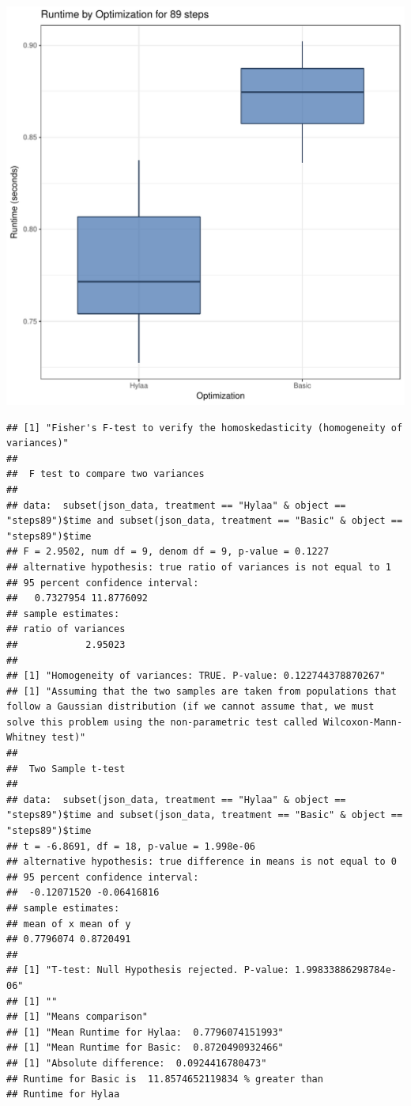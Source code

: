 \documentclass{article}\usepackage[]{graphicx}\usepackage[]{color}
\makeatletter
\def\maxwidth{ %
  \ifdim\Gin@nat@width>\linewidth
    \linewidth
  \else
    \Gin@nat@width
  \fi
}
\newenvironment{kframe}{%
 \def\at@end@of@kframe{}%
 \ifinner\ifhmode%
  \def\at@end@of@kframe{\end{minipage}}%
  \begin{minipage}{\columnwidth}%
 \fi\fi%
 \def\FrameCommand##1{\hskip\@totalleftmargin \hskip-\fboxsep
 \colorbox{shadecolor}{##1}\hskip-\fboxsep
     \hskip-\linewidth \hskip-\@totalleftmargin \hskip\columnwidth}%
 \MakeFramed {\advance\hsize-\width
   \@totalleftmargin\z@ \linewidth\hsize
   \@setminipage}}%
 {\par\unskip\endMakeFramed%
 \at@end@of@kframe}
\newenvironment{knitrout}{}{} %
\makeatother
\begin{document}
\begin{knitrout}
\color{fgcolor}
\includegraphics[width=\maxwidth]{figure/RH3_steps89-1} 
\begin{kframe}\begin{verbatim}
## [1] "Fisher's F-test to verify the homoskedasticity (homogeneity of variances)"
## 
## 	F test to compare two variances
## 
## data:  subset(json_data, treatment == "Hylaa" & object == "steps89")$time and subset(json_data, treatment == "Basic" & object == "steps89")$time
## F = 2.9502, num df = 9, denom df = 9, p-value = 0.1227
## alternative hypothesis: true ratio of variances is not equal to 1
## 95 percent confidence interval:
##   0.7327954 11.8776092
## sample estimates:
## ratio of variances 
##            2.95023 
## 
## [1] "Homogeneity of variances: TRUE. P-value: 0.122744378870267"
## [1] "Assuming that the two samples are taken from populations that follow a Gaussian distribution (if we cannot assume that, we must solve this problem using the non-parametric test called Wilcoxon-Mann-Whitney test)"
## 
## 	Two Sample t-test
## 
## data:  subset(json_data, treatment == "Hylaa" & object == "steps89")$time and subset(json_data, treatment == "Basic" & object == "steps89")$time
## t = -6.8691, df = 18, p-value = 1.998e-06
## alternative hypothesis: true difference in means is not equal to 0
## 95 percent confidence interval:
##  -0.12071520 -0.06416816
## sample estimates:
## mean of x mean of y 
## 0.7796074 0.8720491 
## 
## [1] "T-test: Null Hypothesis rejected. P-value: 1.99833886298784e-06"
## [1] ""
## [1] "Means comparison"
## [1] "Mean Runtime for Hylaa:  0.7796074151993"
## [1] "Mean Runtime for Basic:  0.8720490932466"
## [1] "Absolute difference:  0.0924416780473"
## Runtime for Basic is  11.8574652119834 % greater than 
## Runtime for Hylaa
\end{verbatim}
\end{kframe}
\end{knitrout}
\end{document}
